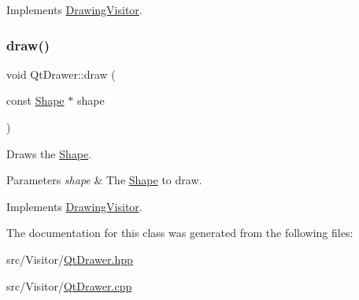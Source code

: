 Implements \hyperlink{class_drawing_visitor_a771a2110a3afe4e87688bddd65657a46}{Drawing\+Visitor}.

\hypertarget{class_qt_drawer_a031e3b3242e341fa6e6fdcbf96b3dbfe}{}\label{class_qt_drawer_a031e3b3242e341fa6e6fdcbf96b3dbfe} 
\subsubsection{\texorpdfstring{draw()}{draw()}\hspace{0.1cm}{\footnotesize\ttfamily [5/5]}}
{\footnotesize\ttfamily void Qt\+Drawer\+::draw (\begin{DoxyParamCaption}\item[{const \hyperlink{class_shape}{Shape} $\ast$}]{shape }\end{DoxyParamCaption})\hspace{0.3cm}{\ttfamily [virtual]}}

Draws the \hyperlink{class_shape}{Shape}. 
\begin{DoxyParams}{Parameters}
{\em shape} & The \hyperlink{class_shape}{Shape} to draw. \\
\hline
\end{DoxyParams}


Implements \hyperlink{class_drawing_visitor_ad3d9e3028449f65ea2c405c74c4a55b4}{Drawing\+Visitor}.



The documentation for this class was generated from the following files\+:\begin{DoxyCompactItemize}
\item 
src/\+Visitor/\hyperlink{_qt_drawer_8hpp}{Qt\+Drawer.\+hpp}\item 
src/\+Visitor/\hyperlink{_qt_drawer_8cpp}{Qt\+Drawer.\+cpp}\end{DoxyCompactItemize}
